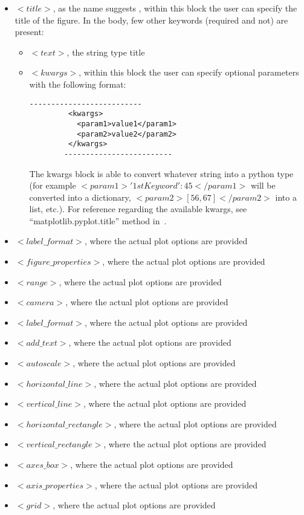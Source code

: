 \begin{itemize}
\begin{itemize}
      \end{itemize}
\item $<title>$, as the name suggests , within this block the user can specify the title of the figure. In the body, few other keywords (required and not) are present:
 \begin{itemize}
        \item \textit{$<text>$}, the string type title
        \item \textit{$<kwargs>$},  within this block the user can specify optional parameters with the following format:
        \begin{lstlisting}[style=XML]
        --------------------------
         <kwargs>
           <param1>value1</param1>
           <param2>value2</param2>
         </kwargs>
        -------------------------
       \end{lstlisting}
         The kwargs block is able to convert whatever string into a python type (for example $<param1>{'1stKeyword':45}</param1>$ will be converted into a dictionary, $<param2>[56,67]</param2>$ into a list, etc.). For reference regarding the available kwargs, see ``matplotlib.pyplot.title'' method in~\cite{MatPlotLib}.
      \end{itemize}
\item $<label\_format>$, where the actual plot options are provided
\item $<figure\_properties>$, where the actual plot options are provided
\item $<range>$, where the actual plot options are provided
\item $<camera>$, where the actual plot options are provided
\item $<label\_format>$, where the actual plot options are provided
\item $<add\_text>$, where the actual plot options are provided
\item $<autoscale>$, where the actual plot options are provided

\item $<horizontal\_line>$, where the actual plot options are provided
\item $<vertical\_line>$, where the actual plot options are provided
\item $<horizontal\_rectangle>$, where the actual plot options are provided
\item $<vertical\_rectangle>$, where the actual plot options are provided
\item $<axes\_box>$, where the actual plot options are provided
\item $<axis\_properties>$, where the actual plot options are provided
\item $<grid>$, where the actual plot options are provided

\vspace{-5mm}
\end{itemize}





